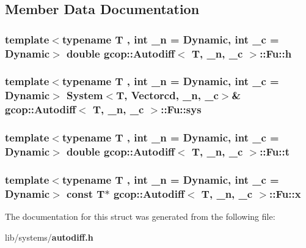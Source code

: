 \subsection{\-Member \-Data \-Documentation}
\subsubsection[{h}]{\setlength{\rightskip}{0pt plus 5cm}template$<$typename T , int \-\_\-n = \-Dynamic, int \-\_\-c = \-Dynamic$>$ double {\bf gcop\-::\-Autodiff}$<$ \-T, \-\_\-n, \-\_\-c $>$\-::{\bf \-Fu\-::h}}\label{structgcop_1_1Autodiff_1_1Fu_a8b00e6e9225ef5dae119f8d63fd7927f}
\subsubsection[{sys}]{\setlength{\rightskip}{0pt plus 5cm}template$<$typename T , int \-\_\-n = \-Dynamic, int \-\_\-c = \-Dynamic$>$ {\bf \-System}$<$\-T, {\bf \-Vectorcd}, \-\_\-n, \-\_\-c$>$\& {\bf gcop\-::\-Autodiff}$<$ \-T, \-\_\-n, \-\_\-c $>$\-::{\bf \-Fu\-::sys}}\label{structgcop_1_1Autodiff_1_1Fu_a3530b32d9bea262ed9d915e69e50477d}
\subsubsection[{t}]{\setlength{\rightskip}{0pt plus 5cm}template$<$typename T , int \-\_\-n = \-Dynamic, int \-\_\-c = \-Dynamic$>$ double {\bf gcop\-::\-Autodiff}$<$ \-T, \-\_\-n, \-\_\-c $>$\-::{\bf \-Fu\-::t}}\label{structgcop_1_1Autodiff_1_1Fu_adfa1cf35dd2ab2c95409a167c3b92f71}
\subsubsection[{x}]{\setlength{\rightskip}{0pt plus 5cm}template$<$typename T , int \-\_\-n = \-Dynamic, int \-\_\-c = \-Dynamic$>$ const \-T$\ast$ {\bf gcop\-::\-Autodiff}$<$ \-T, \-\_\-n, \-\_\-c $>$\-::{\bf \-Fu\-::x}}\label{structgcop_1_1Autodiff_1_1Fu_ab9defbe9b8303fc81c885120c8cd6b28}


\-The documentation for this struct was generated from the following file\-:\begin{DoxyCompactItemize}
\item 
lib/systems/{\bf autodiff.\-h}\end{DoxyCompactItemize}
